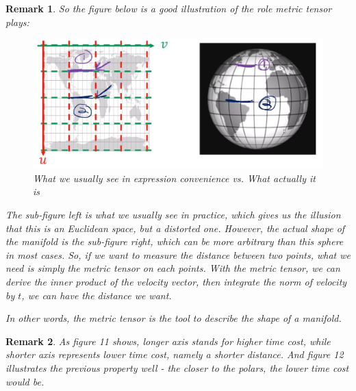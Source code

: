 \documentclass[a4paper]{article}
\theoremstyle{definition}
\theoremstyle{plain}
\newtheorem{remark}{Remark}
\begin{document}
\begin{remark}
So the figure below is a good illustration of the role metric tensor plays:
\begin{figure}[H]
    \centering
    \includegraphics[scale=0.2]{figure/compare.jpg}
    \caption{What we usually see in expression convenience vs. What actually it is}
\end{figure}

The sub-figure left is what we usually see in practice, which gives us the illusion that this is an Euclidean space, but a distorted one. However, the actual shape of the manifold is the sub-figure right, which can be more arbitrary than this sphere in most cases. So, if we want to measure the distance between two points, what we need is simply the metric tensor on each points. With the metric tensor, we can derive the inner product of the velocity vector, then integrate the norm of velocity by $t$, we can have the distance we want.

In other words, the metric tensor is the tool to describe the shape of a manifold.
\end{remark}
\begin{remark}
As figure 11 shows, longer axis stands for higher time cost, while shorter axis represents lower time cost, namely a shorter distance. And figure 12 illustrates the previous property well - the closer to the polars, the lower time cost would be.
\end{remark}
\end{document}
